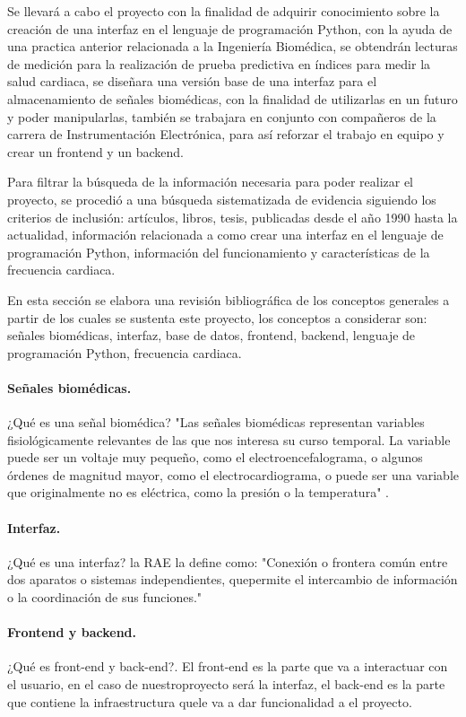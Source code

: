 \documentclass[16pt]{article}
\begin{document}
Se llevará a cabo el proyecto con la finalidad de adquirir conocimiento sobre la creación de una interfaz en el lenguaje de programación Python, con la ayuda de una practica anterior relacionada a la Ingeniería Biomédica, se obtendrán lecturas de medición para la realización de prueba predictiva en índices para medir la salud cardiaca, se diseñara una versión base de una interfaz para el almacenamiento de señales biomédicas, con la finalidad de utilizarlas en un futuro y poder manipularlas, también se trabajara en conjunto con compañeros de la carrera de Instrumentación Electrónica, para así reforzar el trabajo en equipo y crear un frontend y un backend. 

Para filtrar la búsqueda de la información necesaria para poder realizar el proyecto, se procedió a una búsqueda sistematizada de evidencia siguiendo los criterios de inclusión: artículos, libros, tesis, publicadas desde el año 1990 hasta la actualidad, información relacionada a como crear una interfaz en el lenguaje de programación Python, información del funcionamiento y características de la frecuencia cardiaca. 

En esta sección se elabora una revisión bibliográfica de los conceptos generales a partir de los cuales se sustenta este proyecto, los conceptos a considerar son: señales biomédicas, interfaz, base de datos, frontend, backend, lenguaje de programación Python, frecuencia cardiaca.

\paragraph{Señales biomédicas.} ¿Qué es una señal biomédica? "Las señales biomédicas representan variables fisiológicamente relevantes de las que nos interesa su curso temporal. La variable puede ser un voltaje muy pequeño, como el electroencefalograma, o algunos órdenes de magnitud mayor, como el electrocardiograma, o puede ser una variable que originalmente no es eléctrica, como la presión o la temperatura" \cite{biomedica_s}. 
\paragraph{Interfaz.} ¿Qué es una interfaz? la RAE la define como: "Conexión o frontera común entre dos aparatos o sistemas independientes, quepermite el intercambio de información o la coordinación de sus funciones." \cite{rae_interfaz}
\paragraph{Frontend y backend.} ¿Qué es front-end y back-end?. El front-end es la parte que va a interactuar con el usuario, en el caso de nuestroproyecto será la interfaz, el back-end es la parte que contiene la infraestructura quele va a dar funcionalidad a el proyecto. \cite{FrontendBackend}
\end{document}
